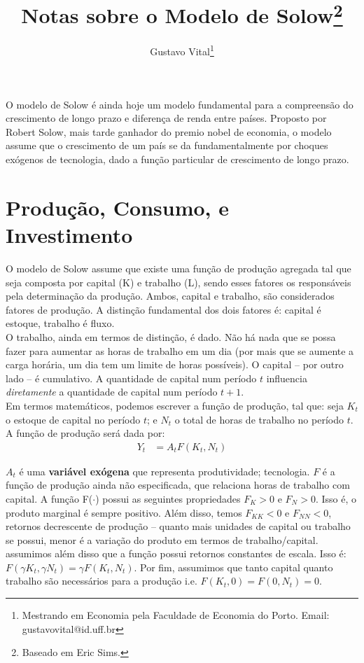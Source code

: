 \documentclass[11pt,a4paper]{article}
\author{Gustavo Vital\thanks{Mestrando em Economia pela Faculdade de Economia do Porto. Email: gustavovital@id.uff.br}}
\title{Notas sobre o Modelo de Solow\footnote{Baseado em Eric Sims.}}
\begin{document}
\maketitle

O modelo de Solow é ainda hoje um modelo fundamental para a compreensão do crescimento de longo prazo e diferença de renda entre países. Proposto por Robert Solow, mais tarde ganhador do premio nobel de economia, o modelo assume que o crescimento de um país se da fundamentalmente por choques exógenos de tecnologia, dado a função particular de crescimento de longo prazo.

\section{Produção, Consumo, e Investimento}

O modelo de Solow assume que existe uma função de produção agregada tal que seja composta por capital (K) e trabalho (L), sendo esses fatores os responsáveis pela determinação da produção. Ambos, capital e trabalho, são considerados fatores de produção. A distinção fundamental dos dois fatores é: capital é estoque, trabalho é fluxo. \\

O trabalho, ainda em termos de distinção, é dado. Não há nada que se possa fazer para aumentar as horas de trabalho em um dia (por mais que se aumente a carga horária, um dia tem um limite de horas possíveis). O capital -- por outro lado -- é cumulativo. A quantidade de capital num período $t$ influencia \textit{diretamente} a quantidade de capital num período $t+1$.\\

Em termos matemáticos, podemos escrever a função de produção, tal que: seja $K_t$ o estoque de capital no período $t$; e $N_t$ o total de horas de trabalho no período $t$. A função de produção será dada por:
\begin{align}
Y_t &= A_t F(K_t, N_t) 
\end{align}

\noindent
$A_t$ é uma \textbf{variável exógena} que representa produtividade; tecnologia. $F$ é a função de produção ainda não especificada, que relaciona horas de trabalho com capital. A função F($\cdot$) possui as seguintes propriedades $F_K>0$ e $F_N>0$. Isso é, o produto marginal é sempre positivo. Além disso, temos $F_{KK}<0$ e $F_{NN}<0$, retornos decrescente de produção -- quanto mais unidades de capital ou trabalho se possui, menor é a variação do produto em termos de trabalho/capital. assumimos além disso que a função possui retornos constantes de escala. Isso é: $F(\gamma  K_t, \gamma N_t) = \gamma F(K_t, N_t)$. Por fim, assumimos que tanto capital quanto trabalho são necessários para a produção i.e. $F(K_t, 0) = F(0, N_t) = 0$.\\
\end{document}
